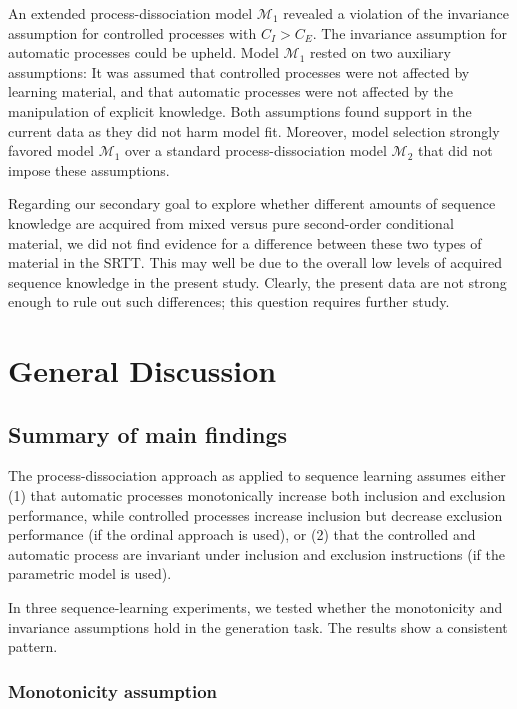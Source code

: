 \documentclass[man]{apa6}
\theoremstyle{definition}
\theoremstyle{definition}
\theoremstyle{definition}
\theoremstyle{remark}
\begin{document}
An extended process-dissociation model \(\mathcal{M}_1\) revealed a
violation of the invariance assumption for controlled processes with
\(C_I > C_E\). The invariance assumption for automatic processes could
be upheld. Model \(\mathcal{M}_1\) rested on two auxiliary assumptions:
It was assumed that controlled processes were not affected by learning
material, and that automatic processes were not affected by the
manipulation of explicit knowledge. Both assumptions found support in
the current data as they did not harm model fit. Moreover, model
selection strongly favored model \(\mathcal{M}_1\) over a standard
process-dissociation model \(\mathcal{M}_2\) that did not impose these
assumptions.

Regarding our secondary goal to explore whether different amounts of
sequence knowledge are acquired from mixed versus pure second-order
conditional material, we did not find evidence for a difference between
these two types of material in the SRTT. This may well be due to the
overall low levels of acquired sequence knowledge in the present study.
Clearly, the present data are not strong enough to rule out such
differences; this question requires further study.

\section{General Discussion}\label{general-discussion}

\subsection{Summary of main findings}\label{summary-of-main-findings}

The process-dissociation approach as applied to sequence learning
assumes either (1) that automatic processes monotonically increase both
inclusion and exclusion performance, while controlled processes increase
inclusion but decrease exclusion performance (if the ordinal approach is
used), or (2) that the controlled and automatic process are invariant
under inclusion and exclusion instructions (if the parametric model is
used).

In three sequence-learning experiments, we tested whether the
monotonicity and invariance assumptions hold in the generation task. The
results show a consistent pattern.

\subsubsection{Monotonicity assumption}\label{monotonicity-assumption}
\end{document}
